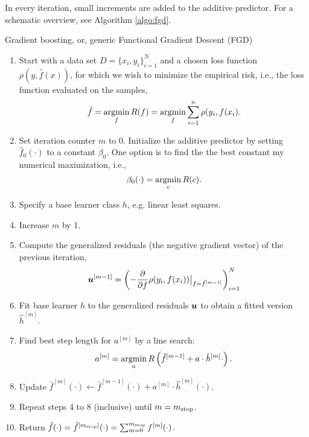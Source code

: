 In every iteration, small increments are added to the additive predictor.
For a schematic overview, see Algorithm \ref{algo:fgd}.
\begin{algorithm}
\caption{Gradient boosting, or, generic Functional Gradient Descent (FGD)}
\label{algo:fgd}
\begin{enumerate}
    \item Start with a data set $D=\{x_i, y_i\}_{i=1}^N$ and a chosen loss function $\rho(y,\hat{f}(x))$, for which we wish to
        minimize the empirical risk, i.e., the loss function evaluated on the samples,
        \begin{equation}
            \hat{f}=\operatorname*{argmin}_{f}R(f)=\operatorname*{argmin}_{f}\sum_{i=1}^n\rho(y_{i},f(x_{i}).
        \end{equation}
    \item Set iteration counter $m$ to 0. Initialize the additive predictor by setting $\hat{f}_0(\cdot)$ to a constant $\beta_0$. One option is to find the the best constant my numerical maximization, i.e.,
        \begin{equation}
            \beta_0(\cdot)=\operatorname*{argmin}_c R(c).
        \end{equation}
    \item Specify a base learner class $h$, e.g. linear least squares.
    \item Increase $m$ by 1.
    \item Compute the generalized residuals (the negative gradient vector) of the previous iteration,
        \begin{equation}
            \bm{u}^{[m-1]}=\left(-\frac{\partial}{\partial f}\rho(y_i, f(x_i))\big\rvert_{f=\hat{f}^{[m-1]}}\right)_{i=1}^N
        \end{equation}
    \item Fit base learner $h$ to the generalized residuals $\bm{u}$ to obtain a fitted version $\hat{h}^{[m]}$.
    \item Find best step length for $a^{[m]}$ by a line search:
        \begin{equation*}
            a^{[m]}=\operatorname*{argmin}_{a}R\left(\hat{f}^{[m-1]}+a\cdot\hat{h}^{[m]}{\cdot}\right).
        \end{equation*}
    \item Update $\hat{f}^{[m]}(\cdot)\gets \hat{f}^{[m-1]}(\cdot)+a^{[m]}\cdot \hat{h}^{[m]}(\cdot)$.
    \item Repeat steps 4 to 8 (inclusive) until $m=m_{\text{stop}}$.
    \item Return $\hat{f}(\cdot)=\hat{f}^{[m_{\text{stop}}]}(\cdot)=\sum_{m=0}^{m_{\text{stop}}}f^{[m]}(\cdot)$.
\end{enumerate}
\end{algorithm}

